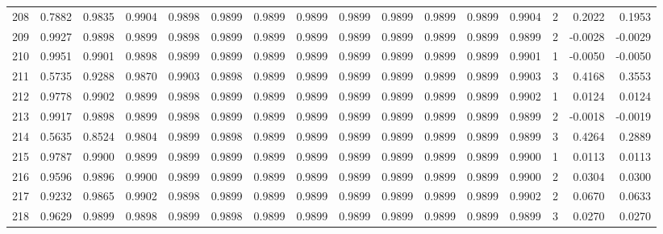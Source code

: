 \begin{tabular}{lrrrrrrrrrrrrrrr}
208 &      0.7882 &  0.9835 &  0.9904 &  0.9898 &  0.9899 &  0.9899 &  0.9899 &  0.9899 &  0.9899 &  0.9899 &   0.9899 &     0.9904 &      2 &                    0.2022 &                     0.1953 \\
209 &      0.9927 &  0.9898 &  0.9899 &  0.9898 &  0.9899 &  0.9899 &  0.9899 &  0.9899 &  0.9899 &  0.9899 &   0.9899 &     0.9899 &      2 &                   -0.0028 &                    -0.0029 \\
210 &      0.9951 &  0.9901 &  0.9898 &  0.9899 &  0.9899 &  0.9899 &  0.9899 &  0.9899 &  0.9899 &  0.9899 &   0.9899 &     0.9901 &      1 &                   -0.0050 &                    -0.0050 \\
211 &      0.5735 &  0.9288 &  0.9870 &  0.9903 &  0.9898 &  0.9899 &  0.9899 &  0.9899 &  0.9899 &  0.9899 &   0.9899 &     0.9903 &      3 &                    0.4168 &                     0.3553 \\
212 &      0.9778 &  0.9902 &  0.9899 &  0.9898 &  0.9899 &  0.9899 &  0.9899 &  0.9899 &  0.9899 &  0.9899 &   0.9899 &     0.9902 &      1 &                    0.0124 &                     0.0124 \\
213 &      0.9917 &  0.9898 &  0.9899 &  0.9898 &  0.9899 &  0.9899 &  0.9899 &  0.9899 &  0.9899 &  0.9899 &   0.9899 &     0.9899 &      2 &                   -0.0018 &                    -0.0019 \\
214 &      0.5635 &  0.8524 &  0.9804 &  0.9899 &  0.9898 &  0.9899 &  0.9899 &  0.9899 &  0.9899 &  0.9899 &   0.9899 &     0.9899 &      3 &                    0.4264 &                     0.2889 \\
215 &      0.9787 &  0.9900 &  0.9899 &  0.9899 &  0.9899 &  0.9899 &  0.9899 &  0.9899 &  0.9899 &  0.9899 &   0.9899 &     0.9900 &      1 &                    0.0113 &                     0.0113 \\
216 &      0.9596 &  0.9896 &  0.9900 &  0.9899 &  0.9899 &  0.9899 &  0.9899 &  0.9899 &  0.9899 &  0.9899 &   0.9899 &     0.9900 &      2 &                    0.0304 &                     0.0300 \\
217 &      0.9232 &  0.9865 &  0.9902 &  0.9898 &  0.9899 &  0.9899 &  0.9899 &  0.9899 &  0.9899 &  0.9899 &   0.9899 &     0.9902 &      2 &                    0.0670 &                     0.0633 \\
218 &      0.9629 &  0.9899 &  0.9898 &  0.9899 &  0.9898 &  0.9899 &  0.9899 &  0.9899 &  0.9899 &  0.9899 &   0.9899 &     0.9899 &      3 &                    0.0270 &                     0.0270 \\

\end{tabular}
